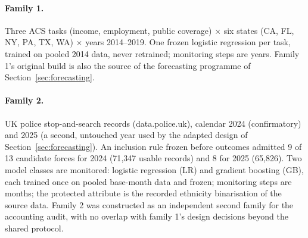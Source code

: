 \documentclass[11pt]{article}
\begin{document}
\paragraph{Family 1.} Three ACS tasks \cite{acs} (income,
employment, public coverage) $\times$ six states (CA, FL, NY, PA,
TX, WA) $\times$ years 2014--2019. One frozen logistic regression per task, trained
on pooled 2014 data, never retrained; monitoring steps are years.
Family 1's original build is also the source of the forecasting
programme of Section~\ref{sec:forecasting}.

\paragraph{Family 2.} UK police stop-and-search records
\cite{policeuk} (data.police.uk), calendar 2024 (confirmatory) and
2025 (a second, untouched year used by the adapted design of
Section~\ref{sec:forecasting}). An inclusion rule frozen before
outcomes admitted 9 of 13 candidate forces for 2024 (71{,}347 usable
records) and 8 for 2025 (65{,}826). Two model classes are monitored:
logistic regression (LR) and gradient boosting (GB), each trained
once on pooled base-month data and frozen; monitoring steps are
months; the protected attribute is the recorded ethnicity
binarisation of the source data. Family 2 was constructed as an
independent second family for the accounting audit, with no overlap
with family 1's design decisions beyond the shared protocol.
\end{document}
